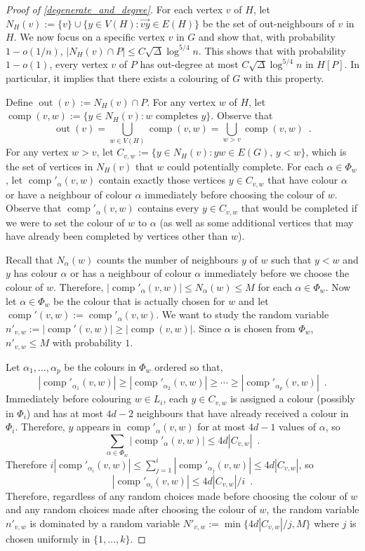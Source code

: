 \documentclass{patmorin}
\DeclareMathOperator{\outn}{out}
\DeclareMathOperator{\comp}{comp}
\begin{document}
\begin{proof}[Proof of \cref{degenerate_and_degree}]
  For each vertex $v$ of $H$, let $N_H(v):=\{v\}\cup \{y\in V(H): \overrightarrow{vy}\in E(H)\}$ be the set of out-neighbours of $v$ in $H$.  We now focus on a specific vertex $v$ in $G$ and show that, with probability $1-o(1/n)$, $|N_H(v)\cap P|\le C\sqrt{\Delta}\log^{5/4} n$.  This shows that with probability $1-o(1)$, every vertex $v$ of $P$ has out-degree at most $C\sqrt{\Delta}\log^{5/4} n$ in $H[P]$.  In particular, it implies that there exists a colouring of $G$ with this property.

  Define $\outn(v):=N_H(v)\cap P$. For any vertex $w$ of $H$, let $\comp(v,w):=\{y\in N_H(v):\text{$w$ completes $y$}\}$.  Observe that
  \[
    \outn(v) = \bigcup_{w\in V(H)} \comp(v,w) = \bigcup_{w>v} \comp(v,w) \enspace .
  \]
  For any vertex $w>v$, let $C_{v,w}:=\{y\in N_H(v): yw\in E(G),\, y < w\}$, which is the set of vertices in $N_H(v)$ that $w$ could potentially complete.  For each $\alpha\in\Phi_w$, let $\comp'_\alpha(v,w)$ contain exactly those vertices $y\in C_{v,w}$ that have colour $\alpha$ or have a neighbour of colour $\alpha$ immediately before choosing the colour of $w$.  Observe that $\comp'_\alpha(v,w)$ contains every $y\in C_{v,w}$ that would be completed if we were to set the colour of $w$ to $\alpha$ (as well as some additional vertices that may have already been completed by vertices other than $w$).

  Recall that $N_\alpha(w)$ counts the number of neighbours $y$ of $w$ such that $y < w$ and $y$ has colour $\alpha$ or has a neighbour of colour $\alpha$ immediately before we choose the colour of $w$.  Therefore,  $|\comp'_\alpha(v,w)|\le N_\alpha(w)\le M$ for each $\alpha\in\Phi_w$.  Now let $\alpha\in\Phi_w$ be the colour that is actually chosen for $w$ and let $\comp'(v,w):=\comp'_\alpha(v,w)$.  We want to study the random variable $n'_{v,w}:=|\comp'(v,w)|\ge |\comp(v,w)|$.  Since $\alpha$ is chosen from $\Phi_w$, $n'_{v,w}\le M$ with probability $1$.

  Let $\alpha_1,\ldots,\alpha_p$ be the colours in $\Phi_w$ ordered so that,
  \[
    |\comp'_{\alpha_1}(v,w)|\ge|\comp'_{\alpha_2}(v,w)|\ge\cdots\ge |\comp'_{\alpha_p}(v,w)| \enspace .
  \]
  Immediately before colouring $w\in L_i$, each $y\in C_{v,w}$ is assigned a colour (possibly in $\Phi_i$) and has at most $4d-2$ neighbours that have already received a colour in $\Phi_i$.  Therefore, $y$ appears in
  $\comp'_{\alpha}(v,w)$ for at most $4d-1$ values of $\alpha$, so
  \[
    \sum_{\alpha\in\Phi_w} |\comp'_{\alpha}(v,w)| \le 4d| C_{v,w}| \enspace .
  \]
  Therefore $i|\comp'_{\alpha_i}(v,w)|\le\sum_{j=1}^i|\comp'_{\alpha_j}(v,w)|\le 4d|C_{v,w}|$, so
  \[
    |\comp'_{\alpha_i}(v,w)|\le 4d|C_{v,w}|/i \enspace .
  \]
  Therefore, regardless of any random choices made before choosing the colour of $w$ and any random choices made after choosing the colour of $w$, the random variable $n'_{v,w}$ is dominated by a random variable $N'_{v,w}:=\min\{4d|C_{v,w}|/j,M\}$ where $j$ is chosen uniformly in $\{1,\ldots,k\}$.


\end{proof}
\end{document}

